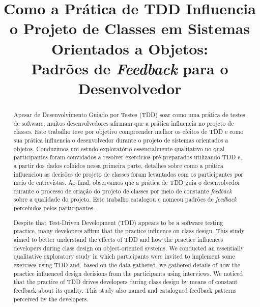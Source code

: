 \documentclass[conference]{IEEEtran}
\begin{document}
	
\title{Como a Prática de TDD Influencia o Projeto de Classes em Sistemas Orientados a Objetos: \\Padrões de \textit{Feedback} para o Desenvolvedor}

\author{
}

\maketitle


\begin{abstract} 
	Apesar de Desenvolvimento Guiado por Testes (TDD) soar como uma prática de testes de software, 
	muitos desenvolvedores afirmam que a prática influencia no projeto de classes.
	Este trabalho teve por objetivo compreender melhor os efeitos de TDD e como sua prática 
	influencia o desenvolvedor durante o projeto de sistemas orientados a objetos.
	Conduzimos um estudo exploratório essencialmente qualitativo 
	no qual participantes foram convidados a resolver exercícios 
	pré-preparados utilizando TDD e, a partir 
	dos dados colhidos nessa primeira parte, detalhes sobre como a prática influenciou as 
	decisões de projeto de classes foram levantados com os participantes por meio de 
	entrevistas. Ao final, observamos que a prática de TDD guia o desenvolvedor durante o processo
	de criação do projeto de classes por meio de constante \textit{feedback} sobre a qualidade
	do projeto. Este trabalho catalogou e nomeou padrões de
	\textit{feedback} percebidos pelos participantes.
\end{abstract}

\vspace{0.2cm}

\begin{abstract} 
	Despite that Test-Driven Development (TDD) appears to be a software testing practice, 
	many developers affirm that the practice influence on class design. This study aimed
	to better understand the effects of TDD and how the practice influences developers
	during class design on object-oriented systems. 
	We conducted an essentially qualitative exploratory study in which participants
	were invited to implement some exercises using TDD and, based on the data gathered,
	we gathered details of how the practice influenced design decisions from the
	participants using interviews.
	We noticed that the practice of TDD drives
	developers during class design by means of constant feedback about its quality. This study
	also named and catalogued feedback patterns perceived by the developers.
\end{abstract}
\end{document}
